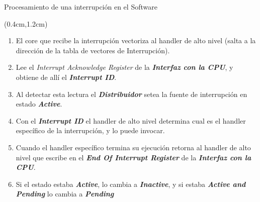 \documentclass[table,x11names,aspectratio=169]{beamer}
\newcounter{saveenumi}
\newcommand{\seti}{\setcounter{saveenumi}{\value{enumi}}}
\begin{document}
\begin{frame}[t]{Procesamiento de una interrupción en el Software}
 \begin{textblock*}{\textwidth}(0.4cm,1.2cm)
  \begin{enumerate}[<+(1)->]\justifying \parskip 0.125cm 
  \seti
   \item El core que recibe la interrupción vectoriza al handler de alto nivel (salta a la dirección de la tabla de vectores de Interrupción).
   \item Lee el \textit{Interrupt Acknowledge Register} de la \textbf{\textit{Interfaz con la CPU}}, y obtiene de allí el \textbf{\textit{Interrupt ID}}.
   \item Al detectar esta lectura el \textbf{\textit{Distribuidor}} setea la fuente de interrupción en estado \textbf{\textit{\color{Blue2}Active}}.
   \item Con el \textit{\textbf{Interrupt ID}} el handler de alto nivel determina cual es el handler específico de la interrupción, y lo puede invocar.
   \item Cuando el handler específico termina su ejecución retorna al handler de alto nivel que escribe en el \textbf{\textit{End Of Interrupt Register}} de la \textbf{\textit{Interfaz con la CPU}}.
   \item Si el estado estaba \textbf{\textit{\color{Blue2}Active}}, lo cambia a \textbf{\textit{\color{Blue1}Inactive}}, y si estaba \textbf{\textit{\color{Blue4}Active and Pending}} lo cambia a \textbf{\textit{\color{Blue3}Pending}}
   \seti
  \end{enumerate}
 \end{textblock*}
\end{frame}
\end{document}

